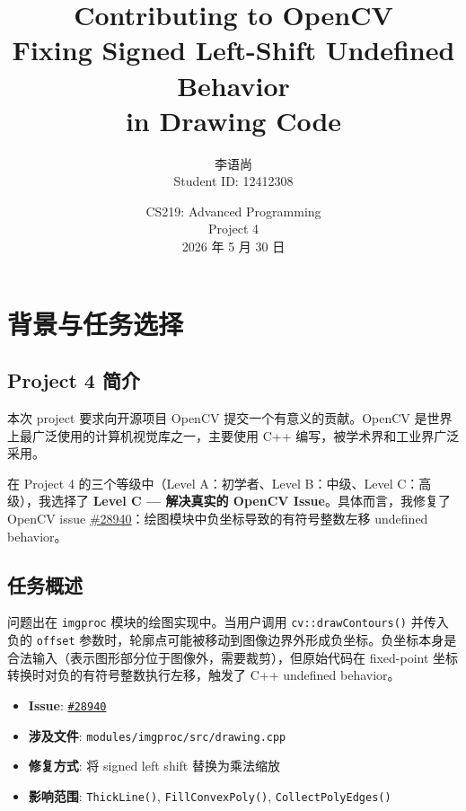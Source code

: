 \documentclass[12pt,a4paper]{article}
\title{\textbf{Contributing to OpenCV\\
        Fixing Signed Left-Shift Undefined Behavior\\
        in Drawing Code}}
\author{李语尚\\\small Student ID: 12412308}
\date{CS219: Advanced Programming\\Project 4\\2026 年 5 月 30 日}
\begin{document}
\maketitle
\thispagestyle{empty}

\newpage
\tableofcontents
\newpage

\section{背景与任务选择}

\subsection{Project 4 简介}

本次 project 要求向开源项目 OpenCV 提交一个有意义的贡献。OpenCV 是世界上最广泛使用的计算机视觉库之一，主要使用 C++ 编写，被学术界和工业界广泛采用。

在 Project 4 的三个等级中（Level A：初学者、Level B：中级、Level C：高级），我选择了 \textbf{Level C — 解决真实的 OpenCV Issue}。具体而言，我修复了 OpenCV issue \href{https://github.com/opencv/opencv/issues/28940}{\#28940}：绘图模块中负坐标导致的有符号整数左移 undefined behavior。

\subsection{任务概述}

问题出在 \texttt{imgproc} 模块的绘图实现中。当用户调用 \texttt{cv::drawContours()} 并传入负的 \texttt{offset} 参数时，轮廓点可能被移动到图像边界外形成负坐标。负坐标本身是合法输入（表示图形部分位于图像外，需要裁剪），但原始代码在 fixed-point 坐标转换时对负的有符号整数执行左移，触发了 C++ undefined behavior。

\begin{itemize}[leftmargin=*]
    \item \textbf{Issue}: \href{https://github.com/opencv/opencv/issues/28940}{\texttt{\#28940}}
    \item \textbf{涉及文件}: \texttt{modules/imgproc/src/drawing.cpp}
    \item \textbf{修复方式}: 将 signed left shift 替换为乘法缩放
    \item \textbf{影响范围}: \texttt{ThickLine()}, \texttt{FillConvexPoly()}, \texttt{CollectPolyEdges()}
\end{itemize}
\end{document}
